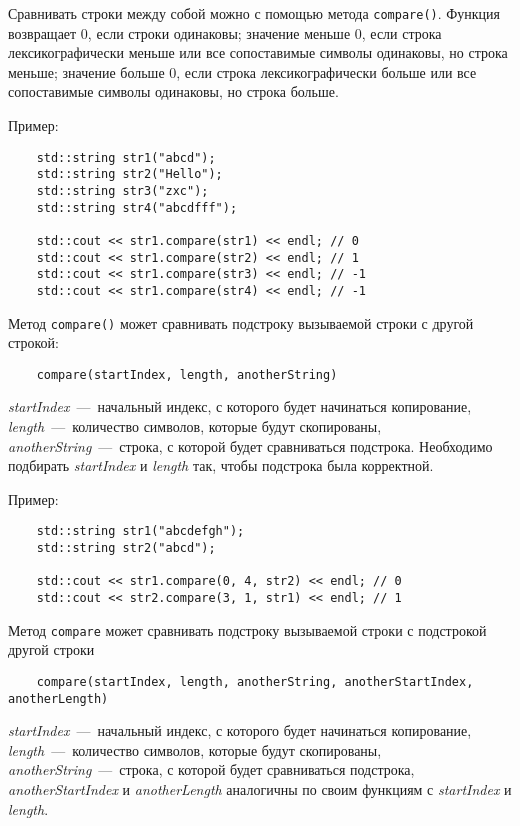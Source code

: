 Сравнивать строки между собой можно с помощью метода \lstinline|compare()|. Функция возвращает 0, если строки одинаковы; значение меньше 0, если строка лексикографически меньше или все сопоставимые символы одинаковы, но строка меньше; значение больше 0, если строка лексикографически больше или все сопоставимые символы одинаковы, но строка больше.

Пример:

\begin{lstlisting}
    std::string str1("abcd");
    std::string str2("Hello");
    std::string str3("zxc");
    std::string str4("abcdfff");

    std::cout << str1.compare(str1) << endl; // 0
    std::cout << str1.compare(str2) << endl; // 1
    std::cout << str1.compare(str3) << endl; // -1
    std::cout << str1.compare(str4) << endl; // -1
\end{lstlisting}

Метод \lstinline|compare()| может сравнивать подстроку вызываемой строки с другой строкой:
\begin{lstlisting}
    compare(startIndex, length, anotherString)
\end{lstlisting}

\textit{startIndex}~---~начальный индекс, с которого будет начинаться копирование, \textit{length}~---~количество символов, которые будут скопированы, \textit{anotherString}~---~строка, с которой будет сравниваться подстрока. Необходимо подбирать \textit{startIndex} и \textit{length} так, чтобы подстрока была корректной.

Пример:

\begin{lstlisting}
    std::string str1("abcdefgh");
    std::string str2("abcd");

    std::cout << str1.compare(0, 4, str2) << endl; // 0
    std::cout << str2.compare(3, 1, str1) << endl; // 1
\end{lstlisting}

Метод \lstinline|compare| может сравнивать подстроку вызываемой строки с подстрокой другой строки
\begin{lstlisting}
    compare(startIndex, length, anotherString, anotherStartIndex, anotherLength)
\end{lstlisting}

\textit{startIndex}~---~начальный индекс, с которого будет начинаться копирование, \textit{length}~---~количество символов, которые будут скопированы, \textit{anotherString}~---~строка, с которой будет сравниваться подстрока, \textit{anotherStartIndex} и \textit{anotherLength} аналогичны по своим функциям с \textit{startIndex} и \textit{length}. 